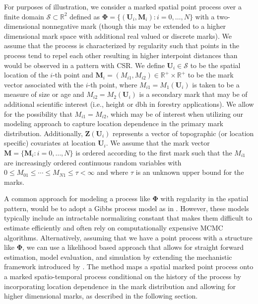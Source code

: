 For purposes of illustration, we consider a marked spatial point process
over a finite domain \(\mathscr{S} \subset \mathbb{R}^2\) defined as
\(\boldsymbol{\Phi} = \{(\boldsymbol{U}_i, \boldsymbol{M}_i): i = 0, \dots, N\}\)
with a two-dimensional nonnegative mark (though this may be extended to
a higher dimensional mark space with additional real valued or discrete
marks). We assume that the process is characterized by regularity such
that points in the process tend to repel each other resulting in higher
interpoint distances than would be observed in a pattern with CSR. We
define \(\boldsymbol{U}_i \in \mathscr{S}\) to be the spatial location of
the \(i\)-th point and
\(\boldsymbol{M}_i = \left (M_{i1}, M_{i2} \right ) \in \mathbb{R}^{+} \times \mathbb{R}^{+}\)
to be the mark vector associated with the \(i\)-th point, where
\(M_{i1} = M_1(\boldsymbol{U}_i)\) is taken to be a measure of size or age
and \(M_{i2} = M_2(\boldsymbol{U}_i)\) is a secondary mark that may be of
additional scientific interest (i.e., height or dbh in forestry
applications). We allow for the possibility that \(M_{i1} = M_{i2}\),
which may be of interest when utilizing our modeling approach to capture
location dependence in the primary mark distribution. Additionally,
\(\boldsymbol{Z}(\boldsymbol{U}_i)\) represents a vector of topographic
(or location specific) covariates at location \(\boldsymbol{U}_i\). We
assume that the mark vector
\(\boldsymbol{M}= \{\boldsymbol{M}_i: i = 0, \dots, N\}\) is ordered
according to the first mark such that the \(M_{i1}\) are increasingly
ordered continuous random variables with
\(0 \leq M_{01} \leq \cdots \leq M_{N1} \leq \tau < \infty\) and where
\(\tau\) is an unknown upper bound for the marks.

A common approach for modeling a process like \(\boldsymbol{\Phi}\) with
regularity in the spatial pattern, would be to adopt a Gibbs process
model as in \citet{mollerStatisticalInferenceSimulation2003}. However, these
models typically include an intractable normalizing constant that makes
them difficult to estimate efficiently and often rely on computationally
expensive MCMC algorithms. Alternatively, assuming that we have a point
process with a structure like \(\boldsymbol{\Phi}\), we can use a
likelihood based approach that allows for straight forward estimation,
model evaluation, and simulation by extending the mechanistic framework
introduced by \citet{mollerMechanisticSpatiotemporalPoint2016a}. The method
maps a spatial marked point process onto a marked spatio-temporal
process conditional on the history of the process by incorporating
location dependence in the mark distribution and allowing for higher
dimensional marks, as described in the following section.

